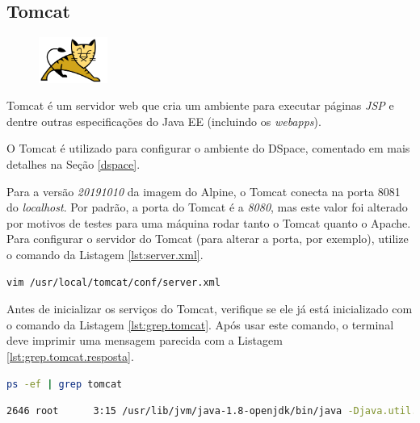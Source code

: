\subsection{Tomcat}\label{tomcat}
\begin{figure} %
    \centering
    \includegraphics[width=0.2\textwidth]{../images/tomcat.png}
\end{figure}

Tomcat é um servidor web que cria um ambiente para executar páginas \textit{JSP} e dentre outras especificações do Java EE (incluindo os \textit{webapps}).

O Tomcat é utilizado para configurar o ambiente do DSpace, comentado em mais detalhes na Seção \ref{dspace}.

Para a versão \textit{20191010} da imagem do Alpine, o Tomcat conecta na porta 8081 do \textit{localhost}. Por padrão, a porta do Tomcat é a \textit{8080}, mas este valor foi alterado por motivos de testes para uma máquina rodar tanto o Tomcat quanto o Apache. Para configurar o servidor do Tomcat (para alterar a porta, por exemplo), utilize o comando da Listagem \ref{lst:server.xml}.

\begin{lstlisting}[language=bash, label=lst:server.xml, caption=Abrindo server.xml do Tomcat.]
    vim /usr/local/tomcat/conf/server.xml
\end{lstlisting}

Antes de inicializar os serviços do Tomcat, verifique se ele já está inicializado com o comando da Listagem \ref{lst:grep.tomcat}. Após usar este comando, o terminal deve imprimir uma mensagem parecida com a Listagem \ref{lst:grep.tomcat.resposta}.

\begin{lstlisting}[language=bash, label=lst:grep.tomcat, caption=Verificando se o TomCat está inicializado.]
    ps -ef | grep tomcat
\end{lstlisting}

\begin{lstlisting}[language=bash, breaklines=true, label=lst:grep.tomcat.resposta, caption=Parte de uma resposta de um Tomcat que já está rodando]
    2646 root      3:15 /usr/lib/jvm/java-1.8-openjdk/bin/java -Djava.util.logging.config.file=/usr/local/apache-tomcat-8.5.40/conf/logging.properties -Djava.util.logging.manager=org.apache.juli....
\end{lstlisting}

